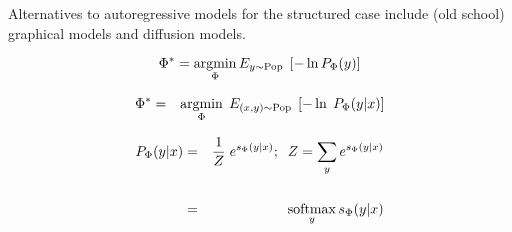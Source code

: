 {Alternatives to autoregressive models for the structured case include (old school) graphical models and diffusion models.


{\color{red} $$\Phi^* = \operatorname*{argmin}_\Phi E_{y \sim \mathrm{Pop}}\;\left[- \ln P_\Phi(y)\right]$$}


\begin{eqnarray*}
\Phi^* & = &  \operatorname*{argmin}_\Phi \;E_{(x,y) \sim \mathrm{Pop}}\;\left[ -\ln \;P_\Phi(y|x) \right]
\end{eqnarray*}

\vfill
\begin{eqnarray*}
 P_\Phi(y|x) & = & \frac{1}{Z}\;e^{s_\Phi(y|x)};\;\; Z = \sum_y e^{s_\Phi(y|x)} \\
  \\
  & = & \operatorname*{softmax}_y s_\Phi(y|x)
\end{eqnarray*}

}

